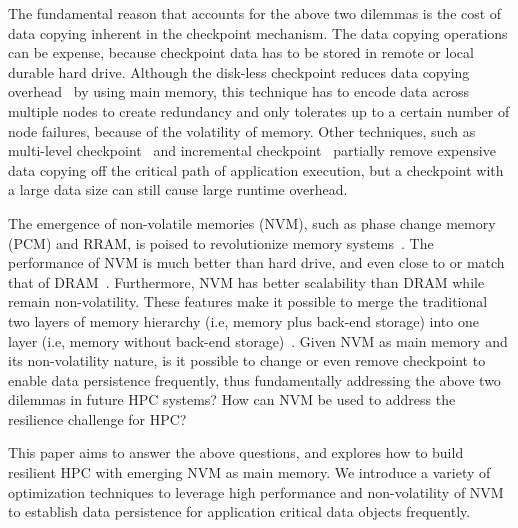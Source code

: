The fundamental reason that accounts for the above two dilemmas 
is the cost of data copying inherent in the checkpoint mechanism.
The data copying operations can be expense, because
checkpoint data has to be stored in remote or local durable hard drive. 
Although the disk-less checkpoint reduces data copying overhead~\cite{tpds98:plank, Lu:2005:SDC:1145057, ppopp17:tang, isftc94:plank, ipdps09:bronevetsky}
by using main memory, this technique has to encode data across multiple nodes to create redundancy and only tolerates up to a certain number of node failures, because of the volatility of memory.
Other techniques, such as multi-level checkpoint~\cite{sc10:moody, sc09:dong, sc11:gomez} and incremental checkpoint~\cite{isftc94:plank, ics04:agarwal, icpads10:wang, ipdps09:bronevetsky} partially remove expensive data copying off the critical path of application execution,
but a checkpoint with a large data size can still cause large runtime overhead.

The emergence of non-volatile memories (NVM), such as phase change memory (PCM) and RRAM, is poised to revolutionize memory systems~\cite{sc10:Caulfield, cse15:vetter}.
The performance of NVM is much better than hard drive, and even close to or match that of DRAM~\cite{NVMDB, eurosys16:dulloor}. 
Furthermore, NVM has better scalability than DRAM while remain non-volatility. These features make it possible to merge the traditional two layers of memory hierarchy (i.e, memory plus back-end storage) into one layer (i.e, memory without back-end storage)~\cite{imw13:mutlu}.
Given NVM as main memory and its non-volatility nature,
is it possible to change or even remove checkpoint to enable data persistence frequently, thus fundamentally addressing the above two dilemmas in future HPC systems?
How can NVM be used to address the resilience challenge for HPC?

This paper aims to answer the above questions, and explores
how to build resilient HPC with emerging NVM as main memory.
We introduce a variety of optimization techniques
to leverage high performance and non-volatility of
NVM to establish data persistence for application critical data objects frequently.

\begin{comment}
constraining NVRAM write order, necessary
to ensure recovery correctness, limits NVRAM write concurrency and degrades throughput.

We require new memory interfaces to minimally describe write constraints and allow high performance and high concurrency data structures.
\end{comment}

